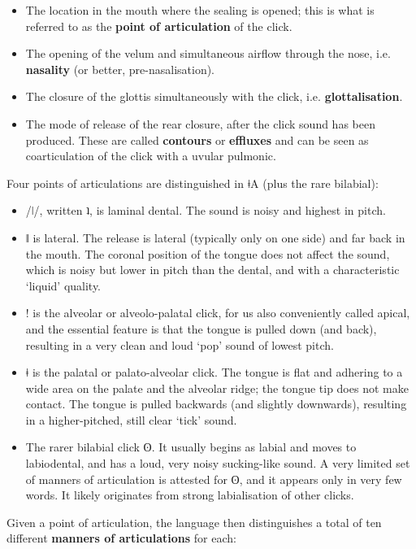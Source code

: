 \documentclass[11pt,a5paper]{book}
\newcommand{\qcn}[1]{\textcolor{AccentText}{\large#1}}
\newcommand{\langname}{\qcn{ǂA}}
\begin{document}
\begin{itemize}
	\item The location in the mouth where the sealing is opened; this is what is referred to as the \textbf{point of articulation} of the click.
	\item The opening of the velum and simultaneous airflow through the nose, i.e. \textbf{nasality} (or better, pre-nasalisation).
	\item The closure of the glottis simultaneously with the click, i.e. \textbf{glottalisation}.
	\item The mode of release of the rear closure, after the click sound has been produced. These are called \textbf{contours} or \textbf{effluxes} and can be seen as coarticulation of the click with a uvular pulmonic.
\end{itemize}

Four points of articulations are distinguished in \langname{} (plus the rare bilabial):

\begin{itemize}
	\item  /ǀ/, written \qcn{ʇ}, is laminal dental. The sound is noisy and highest in pitch.
	\item \qcn{ǁ} is lateral. The release is lateral (typically only on one side) and far back in the mouth. The coronal position of the tongue does not affect the sound, which is noisy but lower in pitch than the dental, and with a characteristic `liquid' quality.
	\item \qcn{!} is the alveolar or alveolo-palatal click, for us also conveniently called apical, and the essential feature is that the tongue is pulled down (and back), resulting in a very clean and loud `pop' sound of lowest pitch.
	 \item \qcn{ǂ} is the palatal or palato-alveolar click. The tongue is flat and adhering to a wide area on the palate and the alveolar ridge; the tongue tip does not make contact. The tongue is pulled backwards (and slightly downwards), resulting in a higher-pitched, still clear `tick' sound.
	\item The rarer bilabial click \qcn{ʘ}. It usually begins as labial and moves to labiodental, and has a loud, very noisy sucking-like sound. A very limited set of manners of articulation is attested for \qcn{ʘ}, and it appears only in very few words. It likely originates from strong labialisation of other clicks.
\end{itemize}

Given a point of articulation, the language then distinguishes a total of ten different \textbf{manners of articulations} for each:
\end{document}
